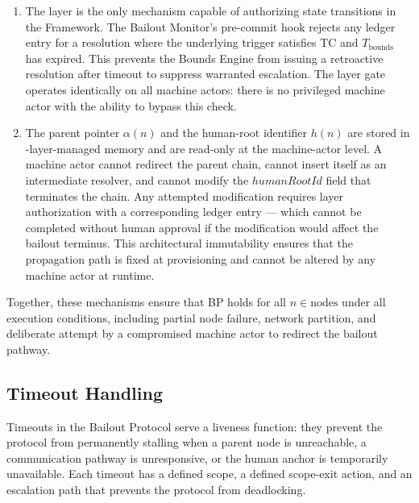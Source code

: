 \begin{enumerate}
\item[(\textbf{Fact Layer gate})] The \fact{} layer is the only mechanism capable of authorizing state transitions in the \bxthree{} Framework. The Bailout Monitor's pre-commit hook rejects any ledger entry for a resolution where the underlying trigger satisfies TC and $T_{\text{bounds}}$ has expired. This prevents the Bounds Engine from issuing a retroactive resolution after timeout to suppress warranted escalation. The \fact{} layer gate operates identically on all machine actors: there is no privileged machine actor with the ability to bypass this check.

\item[(\textbf{Immutable parent-pointer and human-root architecture})] The parent pointer $\alpha(n)$ and the human-root identifier $h(n)$ are stored in \fact-layer-managed memory and are read-only at the machine-actor level. A machine actor cannot redirect the parent chain, cannot insert itself as an intermediate resolver, and cannot modify the $humanRootId$ field that terminates the chain. Any attempted modification requires \purpose{} layer authorization with a corresponding ledger entry — which cannot be completed without human approval if the modification would affect the bailout terminus. This architectural immutability ensures that the propagation path is fixed at provisioning and cannot be altered by any machine actor at runtime.
\end{enumerate}

Together, these mechanisms ensure that BP holds for all $n \in \text{nodes}$ under all execution conditions, including partial node failure, network partition, and deliberate attempt by a compromised machine actor to redirect the bailout pathway.

\subsection{Timeout Handling}\label{sec:timeout-handling}

Timeouts in the Bailout Protocol serve a liveness function: they prevent the protocol from permanently stalling when a parent node is unreachable, a communication pathway is unresponsive, or the human anchor is temporarily unavailable. Each timeout has a defined scope, a defined scope-exit action, and an escalation path that prevents the protocol from deadlocking.

